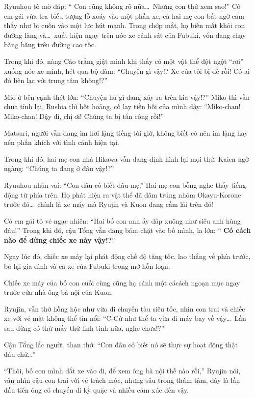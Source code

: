 \documentclass[../main.tex]{subfiles}
\begin{document}
Ryuuhou tò mò đáp: ``{\color{red} Con cũng không rõ nữa\dots\ Nhưng con thử xem sao!}'' Cô em gái vừa tra biểu tượng lỗ xoáy vào một phần xe, cả hai mẹ con bất ngờ cảm thấy như bị cuốn vào một lực hút mạnh. Trong chớp mắt, họ biến mất khỏi con đường làng và\dots\ xuất hiện ngay trên nóc xe cảnh sát của Fubuki, vốn đang chạy băng băng trên đường cao tốc.

Trong khi đó, nàng Cáo trắng giật mình khi thấy có một vật thể đột ngột ``rơi'' xuống nóc xe mình, hét qua bộ đàm: ``Chuyện gì vậy!? Xe của tôi bị đè rồi! Có ai đó liên lạc với trung tâm không!?''

Mio ở bên cạnh thét lớn: ``Chuyện hú gì đang xảy ra trên kia vậy!?'' Miko thì vẫn chưa tỉnh lại, Rushia thì hốt hoảng, cố lay tiền bối của mình dậy: ``Miko-chan! Miko-chan! Dậy đi, chị ơi! Chúng ta bị tấn công rồi!''

Matsuri, người vẫn đang im hơi lặng tiếng tới giờ, không biết cô nên im lặng hay nên phấn khích với tình cảnh hiện tại.

Trong khi đó, hai mẹ con nhà Hikawa vẫn đang định hình lại mọi thứ. Kaien ngỡ ngàng: ``{\color{red}Chúng ta đang ở đâu vậy!?}''

Ryuuhou nhún vai: ``{\color{red}Con đâu có biết đâu mẹ.}'' Hai mẹ con bỗng nghe thấy tiếng động từ phía trên. Họ phát hiện ra vật thể đã đâm trúng nhóm Okayu-Korone trước đó\dots\ chính là xe máy mà Ryujin và Kuon đang cầm lái trên đó!

Cô em gái tỏ vẻ ngạc nhiên: ``{\color{red}Hai bố con anh ấy đáp xuông như siêu anh hùng đâu!}'' Trong khi đó, cậu Tổng vẫn đang bám chặt vào bố mình, la lớn: ``{\color{red} \textbf{Có cách nào để dừng chiếc xe này vậy!?}}''

Ngay lúc đó, chiếc xe máy lại phát động chế độ tăng tốc, lao thẳng về phía trước, bỏ lại gia đình và cả xe của Fubuki trong mớ hỗn loạn.

Chiếc xe máy của bố con cuối cùng cũng hạ cánh một cácách ngoạn mục ngay trước cửa nhà ông bà nội của Kuon.

Ryujin, vẫn thở hồng hộc như vừa đi chuyến tàu siêu tốc, nhìn con trai và chiếc xe với vẻ mặt không thể tin nổi: ``{\color{red}C-Cứ như thể ta vừa đi máy bay về vậy\dots\ Lần sau đừng có thử mấy thứ linh tinh nữa, nghe chưa!?}''

Cậu Tổng lắc người, than thở: ``{\color{red}Con đâu có biết nó sẽ thực sự hoạt động thật đâu chứ\dots}''

``{\color{red}Thôi, bố con mình dắt xe vào đi, để xem ông bà nội thế nào rồi,}'' Ryujin nói, vân nhìn cậu con trai với vẻ trách móc, nhưng sâu trong thâm tâm, đây là lần đầu tiên ông có chuyến đi kỳ quặc và nhiều cảm xúc đến vậy.
\end{document}
